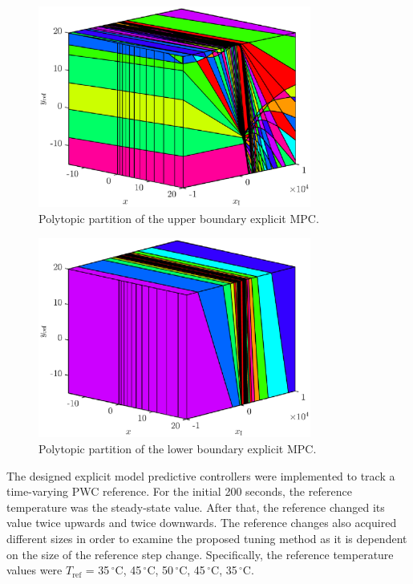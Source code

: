 \documentclass[preprint,12pt]{elsarticle}
\begin{document}
\begin{figure}
	\begin{center}
		\includegraphics[width=0.8\textwidth]{images/partition_U}
		\caption{Polytopic partition of the upper boundary explicit MPC.}
		\label{fig:partition_U}
	\end{center}
\end{figure}

\begin{figure}
	\begin{center}
		\includegraphics[width=0.8\textwidth]{images/partition_L}
		\caption{Polytopic partition of the lower boundary explicit MPC.}
	\label{fig:partition_L}
\end{center}
\end{figure}


The designed explicit model predictive controllers were implemented to track a time-varying PWC reference. 
For the initial 200 seconds, the reference temperature was the steady-state value. After that, the reference changed its value twice upwards and twice downwards. The reference changes also acquired different sizes in order to examine the proposed tuning method as it is dependent on the size of the reference step change. Specifically, the reference temperature values were $T_{\mathrm{ref}}$ = 35\,$^{\circ}\mathrm{C}$, 45\,$^{\circ}\mathrm{C}$, 50\,$^{\circ}\mathrm{C}$, 45\,$^{\circ}\mathrm{C}$, 35\,$^{\circ}\mathrm{C}$.
\end{document}
